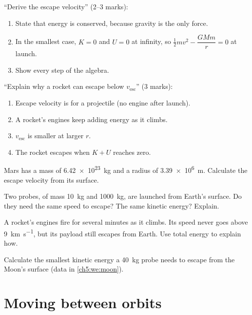 \begin{examtip}
``Derive the escape velocity'' (2--3 marks):
\begin{enumerate}
  \item State that energy is conserved, because gravity is the only force.
  \item In the smallest case, $K = 0$ and $U = 0$ at infinity, so
        $\tfrac{1}{2}mv^2 - \dfrac{GMm}{r} = 0$ at launch.
  \item Show every step of the algebra.
\end{enumerate}
``Explain why a rocket can escape below $v_\mathrm{esc}$'' (3 marks):
\begin{enumerate}
  \item Escape velocity is for a projectile (no engine after launch).
  \item A rocket's engines keep adding energy as it climbs.
  \item $v_\mathrm{esc}$ is smaller at larger $r$.
  \item The rocket escapes when $K + U$ reaches zero.
\end{enumerate}
\end{examtip}

\begin{quickcheck}
  \item Mars has a mass of \qty{6.42e23}{kg} and a radius of \qty{3.39e6}{m}.
        Calculate the escape velocity from its surface.
  \item\label{ch5:qc:twoprobes} Two probes, of mass \qty{10}{kg} and
        \qty{1000}{kg}, are launched from Earth's surface. Do they need the same
        speed to escape? The same kinetic energy? Explain.%
  \item A rocket's engines fire for several minutes as it climbs. Its speed
        never goes above \qty{9}{km.s^{-1}}, but its payload still escapes from
        Earth. Use total energy to explain how.
  \item Calculate the smallest kinetic energy a \qty{40}{kg} probe needs to escape
        from the Moon's surface (data in \cref{ch5:we:moon}).
\end{quickcheck}

\section{Moving between orbits}\label{ch5:sec:transfer}


